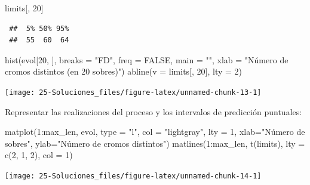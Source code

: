 \documentclass[
  10pt,
]{book}
\newenvironment{Shaded}{\begin{snugshade}}{\end{snugshade}}
\newcommand{\AttributeTok}[1]{\textcolor[rgb]{0.77,0.63,0.00}{#1}}
\newcommand{\ConstantTok}[1]{\textcolor[rgb]{0.00,0.00,0.00}{#1}}
\newcommand{\DecValTok}[1]{\textcolor[rgb]{0.00,0.00,0.81}{#1}}
\newcommand{\FunctionTok}[1]{\textcolor[rgb]{0.00,0.00,0.00}{#1}}
\newcommand{\NormalTok}[1]{#1}
\newcommand{\SpecialCharTok}[1]{\textcolor[rgb]{0.00,0.00,0.00}{#1}}
\newcommand{\StringTok}[1]{\textcolor[rgb]{0.31,0.60,0.02}{#1}}
\theoremstyle{break}
\theoremstyle{nonumberplain}
\begin{document}
\begin{Shaded}
\begin{Highlighting}[]
\NormalTok{limits[, }\DecValTok{20}\NormalTok{]}
\end{Highlighting}
\end{Shaded}

\begin{verbatim}
 ##  5% 50% 95% 
 ##  55  60  64
\end{verbatim}

\begin{Shaded}
\begin{Highlighting}[]
\FunctionTok{hist}\NormalTok{(evol[}\DecValTok{20}\NormalTok{, ], }\AttributeTok{breaks =} \StringTok{"FD"}\NormalTok{, }\AttributeTok{freq =} \ConstantTok{FALSE}\NormalTok{,}
     \AttributeTok{main =} \StringTok{""}\NormalTok{, }\AttributeTok{xlab =} \StringTok{"Número de cromos distintos (en 20 sobres)"}\NormalTok{)}
\FunctionTok{abline}\NormalTok{(}\AttributeTok{v =}\NormalTok{ limits[, }\DecValTok{20}\NormalTok{], }\AttributeTok{lty =} \DecValTok{2}\NormalTok{)}
\end{Highlighting}
\end{Shaded}

\begin{center}\texttt{[image: 25-Soluciones\_files/figure-latex/unnamed-chunk-13-1]} \end{center}

Representar las realizaciones del proceso y los intervalos de predicción puntuales:

\begin{Shaded}
\begin{Highlighting}[]
\FunctionTok{matplot}\NormalTok{(}\DecValTok{1}\SpecialCharTok{:}\NormalTok{max\_len, evol, }\AttributeTok{type =} \StringTok{"l"}\NormalTok{, }\AttributeTok{col =} \StringTok{"lightgray"}\NormalTok{, }\AttributeTok{lty =} \DecValTok{1}\NormalTok{,}
    \AttributeTok{xlab=}\StringTok{"Número de sobres"}\NormalTok{, }\AttributeTok{ylab=}\StringTok{"Número de cromos distintos"}\NormalTok{)}
\FunctionTok{matlines}\NormalTok{(}\DecValTok{1}\SpecialCharTok{:}\NormalTok{max\_len, }\FunctionTok{t}\NormalTok{(limits), }\AttributeTok{lty =} \FunctionTok{c}\NormalTok{(}\DecValTok{2}\NormalTok{, }\DecValTok{1}\NormalTok{, }\DecValTok{2}\NormalTok{), }\AttributeTok{col =} \DecValTok{1}\NormalTok{)}
\end{Highlighting}
\end{Shaded}

\begin{center}\texttt{[image: 25-Soluciones\_files/figure-latex/unnamed-chunk-14-1]} \end{center}
\end{document}
